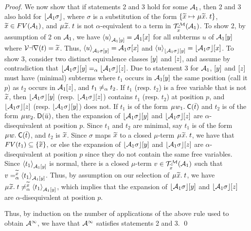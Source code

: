 \begin{report}
\begin{proof}
We now show that if statements 2 and 3 hold for some $\Val_1$,
then 2 and 3 also hold for $\nf{\Val_1 \sigma}$,
where $\sigma$ is a substitution of the form $\{ {\Varec{x}} \mapsto \MU{\Varec{x}}.\; t \}$,
${\Varec{x}} \in FV( \Val_1 )$,
and $\MU {\Varec{x}}.\; t$ is not $\alpha$-equivalent to a term in $\mathcal{T}^\M_{\Varec{x}}(\Val_1)$.
To show 2,
by assumption of 2 on $\Val_1$, we have $\interp{\Val_1 \ec{y}}{ u } = \Val_1 \ec{x}$ for
all subterms $u$ of $\Val_1 \ec{y}$ where $\muvar(t) = {\Varec{x}}$.
Thus, $\interp{\Val_1 \sigma \ec{y}}{ u } = \Val_1 \sigma \ec{x}$ and
$\interp{\nf{\Val_1 \sigma} \ec{y}}{ u } = \nf{\Val_1 \sigma} \ec{x}$.
To show 3, 
consider two distinct equivalence classes $\ec{y}$ and $\ec{z}$,
and assume by contradiction that $\nf{\Val_1 \sigma} \ec{y} \aequiv \nf{\Val_1 \sigma} \ec{z}$.
Due to statement 3 for $\Val_1$,
$\ec{y}$ and $\ec{z}$ must have (minimal) subterms 
where $t_1$ occurs in $\Val_1 \ec{y}$ the same position (call it $p$) as $t_2$ occurs in $\Val_1 \ec{z}$,
and $t_1 \not\aequiv t_2$.
If $t_1$ (resp. $t_2$) is a free variable that is not ${\Varec{x}}$,
then $\nf{\Val_1 \sigma} \ec{y}$ (resp. $\nf{\Val_1 \sigma} \ec{z}$)
contains $t_1$ (resp. $t_2$) at position $p$,
and $\nf{\Val_1 \sigma} \ec{z}$ (resp. $\nf{\Val_1 \sigma} \ec{y}$) does not.
If $t_1$ is of the form $\MU w_1.\; \const{C}( \vec t )$ 
and $t_2$ is of the form $\MU w_2.\; \const{D}( \vec u )$,
then the expansion  of $\nf{\Val_1 \sigma} \ec{y}$ and $\nf{\Val_1 \sigma} \ec{z}$
are $\alpha$-disequivalent at position $p$.
Since $t_1$ and $t_2$ are minimal,
say $t_1$ is of the form $\MU w.\; \const{C}( \vec t )$,
and $t_2$ is ${\Varec{x}}$.
Since $\sigma$ maps ${\Varec{x}}$ to a closed $\mu$-term $\MU {\Varec{x}}.\; t$,
we have that $FV( t_1 ) \subseteq \{ {\Varec{x}} \}$,
or else the expansion of $\nf{\Val_1 \sigma} \ec{y}$ and $\nf{\Val_1 \sigma} \ec{z}$
are $\alpha$-disequivalent at position $p$ since they do not contain the same free variables.
Since $\interp{\Val_1 \ec{y}}{t_1}$ is normal,
there is a closed $\mu$-term $v \in \mathcal{T}^\M_{\Varec{x}}( \Val_1 )$
such that $v \vsimv{\Varec{x}} \interp{\Val_1 \ec{y}}{t_1}$.
Thus, by assumption on our selection of $\MU {\Varec{x}}.\; t$,
we have $\MU {\Varec{x}}.\; t \not\vsimv{\Varec{x}} \interp{\Val_1 \ec{y}}{t_1}$,
which implies that the expansion of $\nf{\Val_1 \sigma} \ec{y}$ and $\nf{\Val_1 \sigma} \ec{z}$
are $\alpha$-disequivalent at position $p$. 

Thus, by induction on the number of applications of the above rule used to obtain $\Val^\AST$,
we have that $\Val^\AST$ satisfies statements 2 and 3.
\qed
\end{proof}
\end{report}

